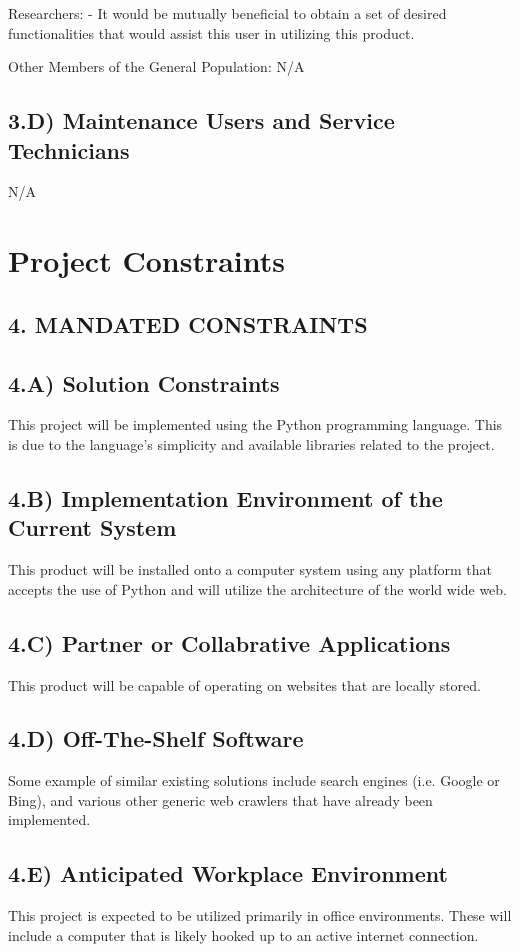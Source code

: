 \documentclass[12pt]{article}
\begin{document}
Researchers:
- It would be mutually beneficial to obtain a set of desired functionalities that would assist this user in utilizing this product.

Other Members of the General Population:
N/A

\subsection*{3.D) Maintenance Users and Service Technicians}
N/A


\section*{Project Constraints}

\subsection*{4. MANDATED CONSTRAINTS}

\subsection*{4.A) Solution Constraints}
	This project will be implemented using the Python programming language. This is due to the language’s simplicity and available libraries related to the project.

\subsection*{4.B) Implementation Environment of the Current System}
This product will be installed onto a computer system using any platform that accepts the use of Python and will utilize the architecture of the world wide web.

\subsection*{4.C) Partner or Collabrative Applications}
This product will be capable of operating on websites that are locally stored.

\subsection*{4.D) Off-The-Shelf Software}
Some example of similar existing solutions include search engines (i.e. Google or Bing), and various other generic web crawlers that have already been implemented.

\subsection*{4.E) Anticipated Workplace Environment}
This project is expected to be utilized primarily in office environments. These will include a computer that is likely hooked up to an active internet connection.
\end{document}
